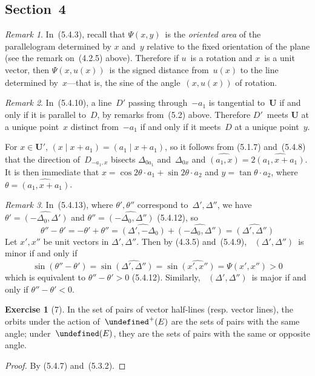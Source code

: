 \documentclass[letterpaper,12pt]{article}
\newcommand{\U}{\mathbf{U}}
\newcommand{\mult}{\cdot}
\let\O\undefined %
\DeclareMathOperator{\O}{\mathbf{O}}
\DeclareMathOperator{\Op}{\O^+}
\DeclareMathOperator{\osector}{S^{\circ}}
\newcommand{\innerprod}[2]{({#1}\;|\;{#2})}
\newcommand{\ang}[2]{\widehat{(#1,#2)}}
\theoremstyle{definition}
\newtheorem*{exer}{Exercise}
\theoremstyle{remark}
\newtheorem*{rmk}{Remark}
\begin{document}
\subsection*{Section~4}
\begin{rmk}
In~(5.4.3), recall that \(\Psi(x,y)\)~is the \emph{oriented area} of the parallelogram determined by \(x\) and~\(y\) relative to the fixed orientation of the plane (see the remark on~(4.2.5) above). Therefore if \(u\)~is a rotation and \(x\)~is a unit vector, then \(\Psi(x,u(x))\)~is the signed distance from~\(u(x)\) to the line determined by~\(x\)---that is, the sine of the angle~\(\ang{x}{u(x)}\) of rotation.
\end{rmk}

\begin{rmk}
In~(5.4.10), a line~\(D'\) passing through~\(-a_1\) is tangential to~\(\U\) if and only if it is parallel to~\(D\), by remarks from~(5.2) above. Therefore \(D'\)~meets \(\U\) at a unique point~\(x\) distinct from~\(-a_1\) if and only if it meets~\(D\) at a unique point~\(y\).

For \(x\in\U'\), \(\innerprod{x}{x+a_1}=\innerprod{a_1}{x+a_1}\), so it follows from (5.1.7) and~(5.4.8) that the direction of~\(D_{-a_1,x}\) bisects \(\Delta_{0a_1}\) and~\(\Delta_{0x}\) and \(\ang{a_1}{x}=2\ang{a_1}{x+a_1}\). It is then immediate that \(x=\cos 2\theta\mult a_1+\sin 2\theta\mult a_2\) and \(y=\tan\theta\mult a_2\), where \(\theta=\ang{a_1}{x+a_1}\).
\end{rmk}

\begin{rmk}
In~(5.4.13), where \(\theta',\theta''\) correspond to~\(\Delta',\Delta''\), we have \(\theta'=\ang{-\Delta_0}{\Delta'}\) and \(\theta''=\ang{-\Delta_0}{\Delta''}\) (5.4.12), so
\[\theta''-\theta'=-\theta'+\theta''=\ang{\Delta'}{-\Delta_0}+\ang{-\Delta_0}{\Delta''}=\ang{\Delta'}{\Delta''}\]
Let \(x',x''\) be unit vectors in \(\Delta',\Delta''\). Then by (4.3.5) and~(5.4.9), \(\osector(\Delta',\Delta'')\)~is minor if and only if
\[\sin(\theta''-\theta')=\sin\ang{\Delta'}{\Delta''}=\sin\ang{x'}{x''}=\Psi(x',x'')>0\]
which is equivalent to \(\theta''-\theta'>0\) (5.4.12). Similarly, \(\osector(\Delta',\Delta'')\)~is major if and only if \(\theta''-\theta'<0\).
\end{rmk}

\begin{exer}[7]
In the set of pairs of vector half-lines (resp. vector lines), the orbits under the action of~\(\Op(E)\) are the sets of pairs with the same angle; under~\(\O(E)\), they are the sets of pairs with the same or opposite angle.
\end{exer}
\begin{proof}
By (5.4.7) and~(5.3.2).
\end{proof}
\end{document}
